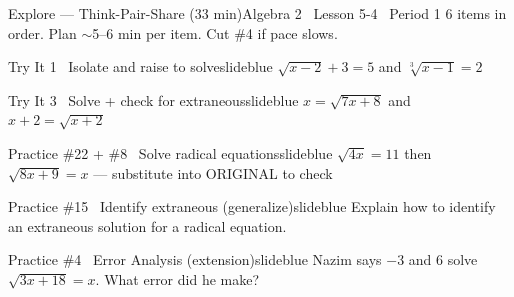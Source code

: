 \documentclass[aspectratio=169, 11pt]{beamer}
\begin{document}
\begin{frame}{Explore --- Think-Pair-Share (33 min)}{Algebra 2 \textperiodcentered\ Lesson 5-4 \textperiodcentered\ Period 1}
\small\textcolor{slidegray}{6 items in order. Plan \(\sim\)5--6 min per item. Cut \#4 if pace slows.}

\vspace{0.1cm}
\begin{projcard}{Try It 1 \textperiodcentered\ Isolate and raise to solve}{slideblue}
\(\sqrt{x-2}+3=5\) \quad and \quad \(\sqrt[3]{x-1}=2\)
\end{projcard}
\vspace{-0.15cm}
\begin{projcard}{Try It 3 \textperiodcentered\ Solve + check for extraneous}{slideblue}
\(x = \sqrt{7x+8}\) \quad and \quad \(x+2 = \sqrt{x+2}\)
\end{projcard}
\vspace{-0.15cm}
\begin{projcard}{Practice \#22 + \#8 \textperiodcentered\ Solve radical equations}{slideblue}
\(\sqrt{4x}=11\) \quad then \quad \(\sqrt{8x+9}=x\) \quad --- substitute into ORIGINAL to check
\end{projcard}
\vspace{-0.15cm}
\begin{projcard}{Practice \#15 \textperiodcentered\ Identify extraneous (generalize)}{slideblue}
Explain how to identify an extraneous solution for a radical equation.
\end{projcard}
\vspace{-0.15cm}
\begin{projcard}{Practice \#4 \textperiodcentered\ Error Analysis (extension)}{slideblue}
Nazim says \(-3\) and \(6\) solve \(\sqrt{3x+18}=x\). What error did he make?
\end{projcard}
\end{frame}
\end{document}
